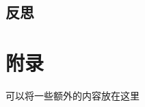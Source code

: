 \documentclass{article}
\theoremstyle{plain}
\theoremstyle{definition}
\theoremstyle{remark}
\begin{document}
\subsection{反思}






\newpage
\appendix
\onecolumn
\section{附录}

可以将一些额外的内容放在这里
\end{document}
